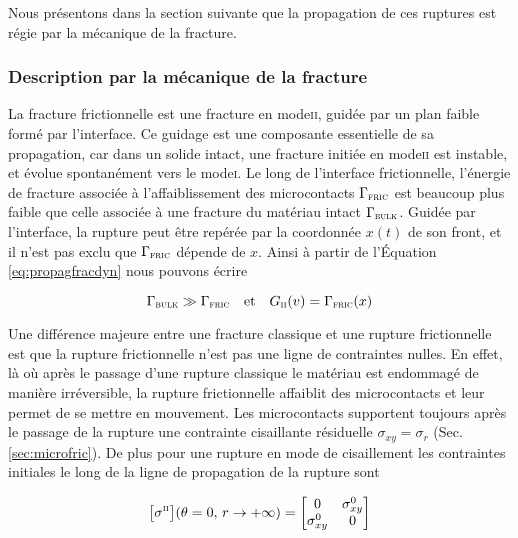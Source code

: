 Nous présentons dans la section suivante que la propagation de ces ruptures est régie par la mécanique de la fracture.


\subsubsection{Description par la mécanique de la fracture}

La fracture frictionnelle est une fracture en mode\:\textsc{ii}, guidée par un plan faible formé par l'interface. Ce guidage est une composante essentielle de sa propagation, car dans un solide intact, une fracture initiée en mode\:\textsc{ii} est instable, et évolue spontanément vers le mode\:\textsc{i}. Le long de l'interface frictionnelle, l'énergie de fracture associée à l'affaiblissement des microcontacts $\Gamma_\textsc{fric}$ est beaucoup plus faible que celle associée à une fracture du matériau intact $\Gamma_\textsc{bulk}$. Guidée par l'interface, la rupture peut être repérée par la coordonnée $x(t)$ de son front, et il n'est pas exclu que $\Gamma_\textsc{fric}$ dépende de $x$. Ainsi à partir de l'Équation\,\ref{eq:propagfracdyn} nous pouvons écrire

\begin{equation}
\Gamma_\textsc{bulk} \gg \Gamma_\textsc{fric}
\quad\text{et}\quad
G_\textsc{ii}(v) = \Gamma_\textsc{fric}(x)
\end{equation}


Une différence majeure entre une fracture classique et une rupture frictionnelle est que la rupture frictionnelle n'est pas une ligne de contraintes nulles. En effet, là où après le passage d'une rupture classique le matériau est endommagé de manière irréversible, la rupture frictionnelle affaiblit des microcontacts et leur permet de se mettre en mouvement. Les microcontacts supportent toujours après le passage de la rupture une contrainte cisaillante résiduelle $\sigma_{xy} =\sigma_r$ (Sec.\,\ref{sec:microfric}). De plus pour une rupture en mode de cisaillement les contraintes initiales le long de la ligne de propagation de la rupture sont

\begin{equation}
\big[\sigma^\textsc{ii}\big] (\theta = 0,\,r\rightarrow+\infty) = \begin{bmatrix}
0 & \sigma_{xy}^0\\
\sigma_{xy}^0 & 0
\end{bmatrix}
\label{eq:initnormal}
\end{equation}

